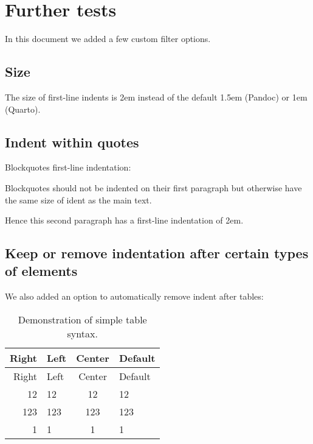 \documentclass[
  letterpaper,
  DIV=11,
  numbers=noendperiod]{scrartcl}
\makeatletter
\renewenvironment{quote}
     {\list{}{\listparindent 1.5em%
              \itemindent \listparindent
              \rightmargin \leftmargin
              \parsep \z@ \@plus \p@}%
            \item\noindent\relax}
      {\endlist}
\makeatother
\begin{document}
\hypertarget{further-tests}{%
\section{Further tests}\label{further-tests}}

In this document we added a few custom filter options.

\hypertarget{size}{%
\subsection{Size}\label{size}}

The size of first-line indents is 2em instead of the default 1.5em
(Pandoc) or 1em (Quarto).

\hypertarget{indent-within-quotes}{%
\subsection{Indent within quotes}\label{indent-within-quotes}}

Blockquotes first-line indentation:

\begin{quote}
\noindent Blockquotes should not be indented on their first paragraph
but otherwise have the same size of ident as the main text.

Hence this second paragraph has a first-line indentation of 2em.
\end{quote}

\hypertarget{keep-or-remove-indentation-after-certain-types-of-elements}{%
\subsection{Keep or remove indentation after certain types of
elements}\label{keep-or-remove-indentation-after-certain-types-of-elements}}

We also added an option to automatically remove indent after tables:

\begin{longtable}[]{@{}rlcl@{}}
\caption{Demonstration of simple table syntax.}\tabularnewline
\toprule()
Right & Left & Center & Default \\
\midrule()
\endfirsthead
\toprule()
Right & Left & Center & Default \\
\midrule()
\endhead
12 & 12 & 12 & 12 \\
123 & 123 & 123 & 123 \\
1 & 1 & 1 & 1 \\
\bottomrule()
\end{longtable}
\end{document}
